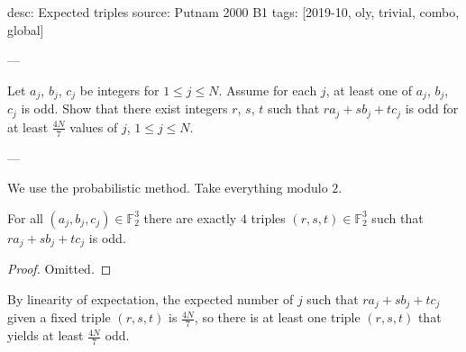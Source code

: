 desc: Expected triples
source: Putnam 2000 B1
tags: [2019-10, oly, trivial, combo, global]

---

Let $a_j$, $b_j$, $c_j$ be integers for $1\le j\le N$. Assume for each $j$, at least one of $a_j$, $b_j$, $c_j$ is odd. Show that there exist integers $r$, $s$, $t$ such that $ra_j+sb_j+tc_j$ is odd for at least $\tfrac{4N}7$ values of $j$, $1\le j\le N$.

---

We use the probabilistic method. Take everything modulo $2$.
\begin{claim*}
    For all $(a_j,b_j,c_j)\in\mathbb F_2^3$ there are exactly $4$ triples $(r,s,t)\in\mathbb F_2^3$ such that $ra_j+sb_j+tc_j$ is odd.
\end{claim*}
\begin{proof}
    Omitted.
\end{proof}

By linearity of expectation, the expected number of $j$ such that $ra_j+sb_j+tc_j$ given a fixed triple $(r,s,t)$ is $\tfrac{4N}7$, so there is at least one triple $(r,s,t)$ that yields at least $\tfrac{4N}7$ odd.
